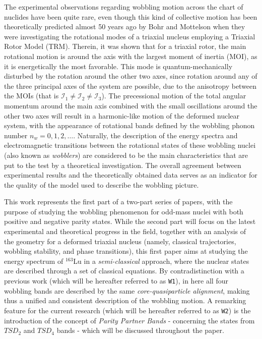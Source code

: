 \documentclass[myclassdoc,debug]{rjparticle}
\begin{document}
The experimental observations regarding wobbling motion across the chart of nuclides have been quite rare, even though this kind of collective motion has been theoretically predicted almost 50 years ago by Bohr and Mottelson \cite{bohr1998nuclear} when they were investigating the rotational modes of a triaxial nucleus employing a Triaxial Rotor Model (TRM). Therein, it was shown that for a triaxial rotor, the main rotational motion is around the axis with the largest moment of inertia (MOI), as it is energetically the most favorable. This mode is quantum-mechanically disturbed by the rotation around the other two axes, since rotation around any of the three principal axes of the system are possible, due to the anisotropy between the MOIs (that is $\mathcal{I}_1\neq\mathcal{I}_2\neq\mathcal{I}_3$). The precessional motion of the total angular momentum around the main axis combined with the small oscillations around the other two axes will result in a harmonic-like motion of the deformed nuclear system, with the appearance of rotational bands defined by the wobbling phonon number $n_w=0,1,2,\dots$. Naturally, the description of the energy spectra and electromagnetic transitions between the rotational states of these wobbling nuclei (also known as \emph{wobblers}) are considered to be the main characteristics that are put to the test by a theoretical investigation. The overall agreement between experimental results and the theoretically obtained data serves as an indicator for the quality of the model used to describe the wobbling picture.

This work represents the first part of a two-part series of papers, with the purpose of studying the wobbling phenomenon for odd-mass nuclei with both positive and negative parity states. While the second part will focus on the latest experimental and theoretical progress in the field, together with an analysis of the geometry for a deformed triaxial nucleus (namely, classical trajectories, wobbling stability, and phase transitions), this first paper aims at studying the energy spectrum of $^{163}$Lu in a \emph{semi-classical} approach, where the nuclear states are described through a set of classical equations. By contradistinction with a previous work \cite{raduta2020towards} (which will be hereafter referred to as \texttt{W1}), in here all four wobbling bands are described by the same \emph{core-quasiparticle alignment}, making thus a unified and consistent description of the wobbling motion. A remarking feature for the current research (which will be hereafter referred to as \texttt{W2}) is the introduction of the concept of \emph{Parity Partner Bands} - concerning the states from $TSD_2$ and $TSD_4$ bands -  which will be discussed throughout the paper.
\end{document}
